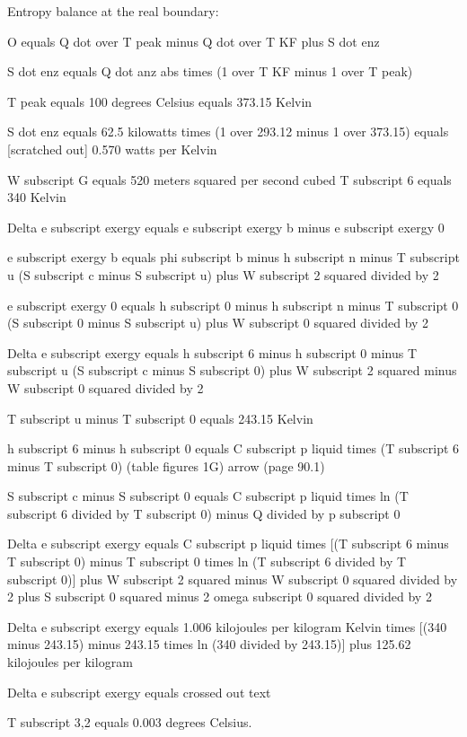 Entropy balance at the real boundary:

O equals Q dot over T peak minus Q dot over T KF plus S dot enz

S dot enz equals Q dot anz abs times (1 over T KF minus 1 over T peak)

T peak equals 100 degrees Celsius equals 373.15 Kelvin

S dot enz equals 62.5 kilowatts times (1 over 293.12 minus 1 over 373.15) equals [scratched out] 0.570 watts per Kelvin

W subscript G equals 520 meters squared per second cubed  
T subscript 6 equals 340 Kelvin  

Delta e subscript exergy equals e subscript exergy b minus e subscript exergy 0  

e subscript exergy b equals phi subscript b minus h subscript n minus T subscript u (S subscript c minus S subscript u) plus W subscript 2 squared divided by 2  

e subscript exergy 0 equals h subscript 0 minus h subscript n minus T subscript 0 (S subscript 0 minus S subscript u) plus W subscript 0 squared divided by 2  

Delta e subscript exergy equals h subscript 6 minus h subscript 0 minus T subscript u (S subscript c minus S subscript 0) plus W subscript 2 squared minus W subscript 0 squared divided by 2  

T subscript u minus T subscript 0 equals 243.15 Kelvin  

h subscript 6 minus h subscript 0 equals C subscript p liquid times (T subscript 6 minus T subscript 0) (table figures 1G) arrow (page 90.1)  

S subscript c minus S subscript 0 equals C subscript p liquid times ln (T subscript 6 divided by T subscript 0) minus Q divided by p subscript 0  

Delta e subscript exergy equals C subscript p liquid times [(T subscript 6 minus T subscript 0) minus T subscript 0 times ln (T subscript 6 divided by T subscript 0)] plus W subscript 2 squared minus W subscript 0 squared divided by 2 plus S subscript 0 squared minus 2 omega subscript 0 squared divided by 2  

Delta e subscript exergy equals 1.006 kilojoules per kilogram Kelvin times [(340 minus 243.15) minus 243.15 times ln (340 divided by 243.15)] plus 125.62 kilojoules per kilogram  

Delta e subscript exergy equals crossed out text

T subscript 3,2 equals 0.003 degrees Celsius.

